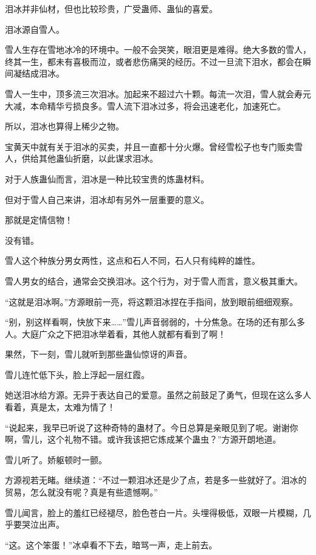 
\begin{this_body}

泪冰并非仙材，但也比较珍贵，广受蛊师、蛊仙的喜爱。

泪冰源自雪人。

雪人生存在雪地冰冷的环境中。一般不会哭笑，眼泪更是难得。绝大多数的雪人，终其一生，都未有喜极而泣，或者悲伤痛哭的经历。不过一旦流下泪水，都会在瞬间凝结成泪冰。

雪人一生中，顶多流三次泪冰。加起来不超过六十颗。每流一次泪，雪人就会寿元大减，本命精华亏损良多。雪人流下泪冰过多，将会迅速老化，加速死亡。

所以，泪冰也算得上稀少之物。

宝黄天中就有关于泪冰的买卖，并且一直都十分火爆。曾经雪松子也专门贩卖雪人，供给其他蛊仙折磨，以此谋求泪冰。

对于人族蛊仙而言，泪冰是一种比较宝贵的炼蛊材料。

但对于雪人自己来讲，泪冰却有另外一层重要的意义。

那就是定情信物！

没有错。

雪人这个种族分男女两性，这点和石人不同，石人只有纯粹的雄性。

雪人男女的结合，通常会交换泪冰。这个行为，对于雪人而言，意义极其重大。

“这就是泪冰啊。”方源眼前一亮，将这颗泪冰捏在手指间，放到眼前细细观察。

“别，别这样看啊，快放下来……”雪儿声音弱弱的，十分焦急。在场的还有那么多人。大庭广众之下把泪冰举着看，其他人就都有看到了啊！

果然，下一刻，雪儿就听到那些蛊仙惊讶的声音。

雪儿连忙低下头，脸上浮起一层红霞。

她送泪冰给方源。无异于表达自己的爱意。虽然之前鼓足了勇气，但现在这么多人看着，真是太，太难为情了！

“说起来，我早已听说了这种奇特的蛊材了。今日总算是亲眼见到了呢。谢谢你啊，雪儿，这个礼物不错。或许我该把它炼成某个蛊虫？”方源开朗地道。

雪儿听了。娇躯顿时一颤。

方源视若无睹。继续道：“不过一颗泪冰还是少了点，若是多一些就好了。泪冰的贸易，怎么就没有呢？真是有些遗憾啊。”

雪儿闻言，脸上的羞红已经褪尽，脸色苍白一片。头埋得极低，双眼一片模糊，几乎要哭泣出声。

“这。这个笨蛋！”冰卓看不下去，暗骂一声，走上前去。


\end{this_body}
